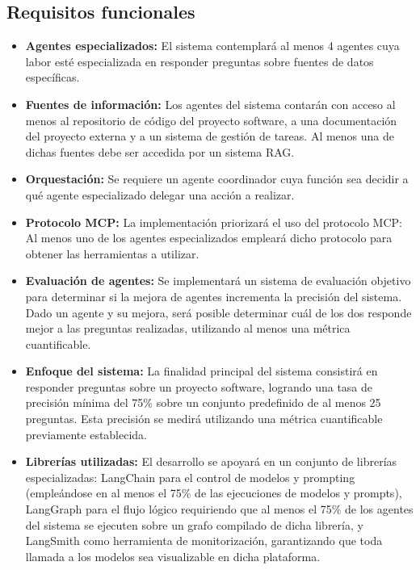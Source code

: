 \subsection{Requisitos funcionales}
\begin{itemize}
\item\textbf{Agentes especializados: }El sistema contemplará al menos 4 agentes cuya labor esté especializada en responder preguntas sobre fuentes de datos específicas.
\item\textbf{Fuentes de información: }Los agentes del sistema contarán con acceso al menos al repositorio de código del proyecto software, a una documentación del proyecto externa y a un sistema de gestión de tareas. Al menos una de dichas fuentes debe ser accedida por un sistema RAG. 
\item\textbf{Orquestación: }Se requiere un agente coordinador cuya función sea decidir a qué agente especializado delegar una acción a realizar.
\item\textbf{Protocolo MCP: }La implementación priorizará el uso del protocolo MCP: Al menos uno de los agentes especializados empleará dicho protocolo para obtener las herramientas a utilizar.
\item\textbf{Evaluación de agentes: }Se implementará un sistema de evaluación objetivo para determinar si la mejora de agentes incrementa la precisión del sistema. Dado un agente y su mejora, será posible determinar cuál de los dos responde mejor a las preguntas realizadas, utilizando al menos una métrica cuantificable.
\item\textbf{Enfoque del sistema: }La finalidad principal del sistema consistirá en responder preguntas sobre un proyecto software, logrando una tasa de precisión mínima del 75\% sobre un conjunto predefinido de al menos 25 preguntas. Esta precisión se medirá utilizando una métrica cuantificable previamente establecida. 
\item\textbf{Librerías utilizadas: }El desarrollo se apoyará en un conjunto de librerías especializadas: LangChain para el control de modelos y prompting (empleándose en al menos el 75\% de las ejecuciones de modelos y prompts), LangGraph para el flujo lógico requiriendo que al menos el 75\% de los agentes del sistema se ejecuten sobre un grafo compilado de dicha librería, y LangSmith como herramienta de monitorización, garantizando que toda llamada a los modelos sea visualizable en dicha plataforma.\end{itemize}
